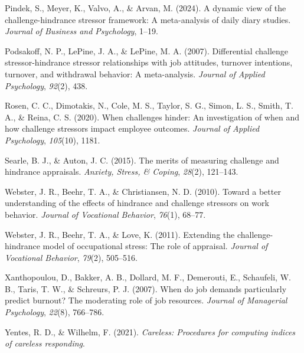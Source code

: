 \documentclass[
  man,mask]{apa7}
\newlength{\cslhangindent}
\newlength{\cslentryspacingunit} %
\newenvironment{CSLReferences}[2] %
 {%
  \setlength{\parindent}{0pt}
  \ifodd #1
  \let\oldpar\par
  \def\par{\hangindent=\cslhangindent\oldpar}
  \fi
  \setlength{\parskip}{#2\cslentryspacingunit}
 }%
 {}
\begin{document}
\begin{CSLReferences}{1}{0}
\leavevmode{}%
Pindek, S., Meyer, K., Valvo, A., \& Arvan, M. (2024). A dynamic view of the challenge-hindrance stressor framework: A meta-analysis of daily diary studies. \emph{Journal of Business and Psychology}, 1--19.

\leavevmode{}%
Podsakoff, N. P., LePine, J. A., \& LePine, M. A. (2007). Differential challenge stressor-hindrance stressor relationships with job attitudes, turnover intentions, turnover, and withdrawal behavior: A meta-analysis. \emph{Journal of Applied Psychology}, \emph{92}(2), 438.

\leavevmode{}%
Rosen, C. C., Dimotakis, N., Cole, M. S., Taylor, S. G., Simon, L. S., Smith, T. A., \& Reina, C. S. (2020). When challenges hinder: An investigation of when and how challenge stressors impact employee outcomes. \emph{Journal of Applied Psychology}, \emph{105}(10), 1181.

\leavevmode{}%
Searle, B. J., \& Auton, J. C. (2015). The merits of measuring challenge and hindrance appraisals. \emph{Anxiety, Stress, \& Coping}, \emph{28}(2), 121--143.

\leavevmode{}%
Webster, J. R., Beehr, T. A., \& Christiansen, N. D. (2010). Toward a better understanding of the effects of hindrance and challenge stressors on work behavior. \emph{Journal of Vocational Behavior}, \emph{76}(1), 68--77.

\leavevmode{}%
Webster, J. R., Beehr, T. A., \& Love, K. (2011). Extending the challenge-hindrance model of occupational stress: The role of appraisal. \emph{Journal of Vocational Behavior}, \emph{79}(2), 505--516.

\leavevmode{}%
Xanthopoulou, D., Bakker, A. B., Dollard, M. F., Demerouti, E., Schaufeli, W. B., Taris, T. W., \& Schreurs, P. J. (2007). When do job demands particularly predict burnout? The moderating role of job resources. \emph{Journal of Managerial Psychology}, \emph{22}(8), 766--786.

\leavevmode{}%
Yentes, R. D., \& Wilhelm, F. (2021). \emph{Careless: Procedures for computing indices of careless responding}.

\end{CSLReferences}

\endgroup
\end{document}
